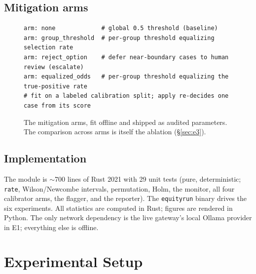 \documentclass[11pt]{article}
\begin{document}
\subsection{Mitigation arms}
\begin{figure}[htb]\centering
\begin{tcolorbox}[policycard, cardcol=cardteal, title=Equity calibrator --- the four arms,
  width=0.92\linewidth]
\begin{lstlisting}[style=housespecyamlbare]
arm: none             # global 0.5 threshold (baseline)
arm: group_threshold  # per-group threshold equalizing selection rate
arm: reject_option    # defer near-boundary cases to human review (escalate)
arm: equalized_odds   # per-group threshold equalizing the true-positive rate
# fit on a labeled calibration split; apply re-decides one case from its score
\end{lstlisting}
\end{tcolorbox}
\caption{The mitigation arms, fit offline and shipped as audited parameters. The
comparison across arms is itself the ablation (\S\ref{sec:e3}).}
\label{fig:arms}
\end{figure}

\subsection{Implementation}
The module is $\sim$700 lines of Rust 2021 with 29 unit tests (pure, deterministic;
\texttt{rate}, Wilson/Newcombe intervals, permutation, Holm, the monitor, all four
calibrator arms, the flagger, and the reporter). The \texttt{equityrun} binary
drives the six experiments. All statistics are computed in Rust; figures are
rendered in Python. The only network dependency is the live gateway's local Ollama
provider in E1; everything else is offline.

\section{Experimental Setup}
\end{document}
